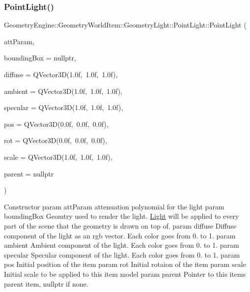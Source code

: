 \subsubsection{\texorpdfstring{PointLight()}{PointLight()}\hspace{0.1cm}{\footnotesize\ttfamily [1/2]}}
{\footnotesize\ttfamily Geometry\+Engine\+::\+Geometry\+World\+Item\+::\+Geometry\+Light\+::\+Point\+Light\+::\+Point\+Light (\begin{DoxyParamCaption}\item[{const Q\+Vector3D \&}]{att\+Param,  }\item[{\mbox{\hyperlink{class_geometry_engine_1_1_geometry_world_item_1_1_geometry_item_1_1_geometry_item}{Geometry\+Item\+::\+Geometry\+Item}} $\ast$}]{bounding\+Box = {\ttfamily nullptr},  }\item[{const Q\+Vector3D \&}]{diffuse = {\ttfamily QVector3D(1.0f,~1.0f,~1.0f)},  }\item[{const Q\+Vector3D \&}]{ambient = {\ttfamily QVector3D(1.0f,~1.0f,~1.0f)},  }\item[{const Q\+Vector3D \&}]{specular = {\ttfamily QVector3D(1.0f,~1.0f,~1.0f)},  }\item[{const Q\+Vector3D \&}]{pos = {\ttfamily QVector3D(0.0f,~0.0f,~0.0f)},  }\item[{const Q\+Vector3D \&}]{rot = {\ttfamily QVector3D(0.0f,~0.0f,~0.0f)},  }\item[{const Q\+Vector3D \&}]{scale = {\ttfamily QVector3D(1.0f,~1.0f,~1.0f)},  }\item[{\mbox{\hyperlink{class_geometry_engine_1_1_geometry_world_item_1_1_world_item}{World\+Item}} $\ast$}]{parent = {\ttfamily nullptr} }\end{DoxyParamCaption})}

Constructor param att\+Param attenuation polynomial for the light param bounding\+Box Geomtry used to render the light. \mbox{\hyperlink{class_geometry_engine_1_1_geometry_world_item_1_1_geometry_light_1_1_light}{Light}} will be applied to every part of the scene that the geometry is drawn on top of. param diffuse Diffuse component of the light as an rgb vector. Each color goes from 0. to 1. param ambient Ambient component of the light. Each color goes from 0. to 1. param specular Specular component of the light. Each color goes from 0. to 1. param pos Initial position of the item param rot Initial rotaion of the item param scale Initial scale to be applied to this item model param parent Pointer to this items parent item, nullptr if none. \mbox{\label{class_geometry_engine_1_1_geometry_world_item_1_1_geometry_light_1_1_point_light_af70f4dc5a17066a9f46e8d98931a1204}} 
